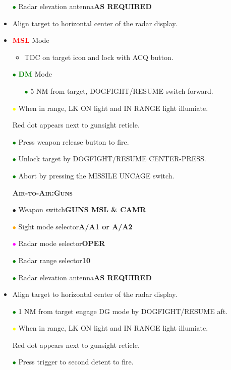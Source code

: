 \documentclass[a4paper,12pt,dvipsnames]{letter}
\newcommand{\button}[1]{\textbf{#1}}
\newcommand{\ok}[1]{\textcolor{Green}{\textbf{#1}}}
\newcommand{\warn}[1]{\textcolor{Red}{\textbf{#1}}}
\newcommand{\myHead}[1]{{\LARGE\textsc{\textbf{#1}}}}
\newcommand{\bi}{\textcolor{ProcessBlue}{$\bullet$\;}}
\newcommand{\gi}{\textcolor{Green}{$\bullet$\;}}
\newcommand{\yi}{\textcolor{Yellow}{$\bullet$\;}}
\newcommand{\mi}{\textcolor{Magenta}{$\bullet$\;}}
\newcommand{\oi}{\textcolor{Orange}{$\bullet$\;}}
\begin{document}
{\begin{itemize}
 \item[\gi] Radar elevation antenna\dotfill\button{AS REQUIRED}
 \item Align target to horizontal center of the radar display.
 \item \warn{MSL} Mode
 \begin{itemize}
 \item TDC on target icon and lock with ACQ button.
  \end{itemize}
  \item[\gi] \ok{DM} Mode
 \begin{itemize}
 \item[\gi] 5 NM from target, DOGFIGHT/RESUME switch forward.
  \end{itemize}
 \item[\yi] When in range, LK ON light and IN RANGE light illumiate.
 \item[] Red dot appears next to gunsight reticle.
 \item[\gi] Press weapon release button to fire.
 \item[\gi] Unlock target by DOGFIGHT/RESUME CENTER-PRESS.
 \item[\gi] Abort by pressing the MISSILE UNCAGE switch.
\end{itemize}
\vspace{0.5em}
\begin{itemize}
 \item[] \myHead{Air-to-Air:\;Guns}
 \item[\bi] Weapon switch\dotfill\button{GUNS MSL \& CAMR}
 \item[\oi] Sight mode selector\dotfill\button{A/A1 or A/A2}
 \item[\mi] Radar mode selector\dotfill\button{OPER}
 \item[\gi] Radar range selector\dotfill\button{10}
 \item[\gi] Radar elevation antenna\dotfill\button{AS REQUIRED}
 \item Align target to horizontal center of the radar display.
 \item[\gi] 1 NM from target engage DG mode by DOGFIGHT/RESUME aft.
 \item[\yi] When in range, LK ON light and IN RANGE light illumiate.
 \item[] Red dot appears next to gunsight reticle.
 \item[\gi] Press trigger to second detent to fire.
\end{itemize}
}
\end{document}
